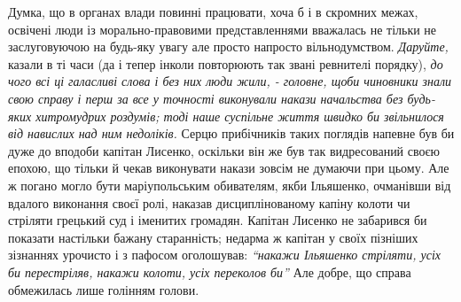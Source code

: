 \documentclass[a4paper,20pt]{report}
\begin{document}
Думка, що в органах влади повинні працювати, хоча б і в скромних межах,
освічені люди із морально-правовими представленнями вважалась не тільки не заслуговуючою
на будь-яку увагу але просто напросто вільнодумством. \emph{Даруйте,} казали в ті часи
(да і тепер інколи повторюють так звані ревнителі порядку), \emph{до чого всі ці галасливі слова і 
без них люди жили, - головне, щоби чиновники знали свою справу і перш за все у точності виконували
накази начальства без будь-яких хитромудрих роздумів; тоді наше суспільне життя швидко би звільнилося
від навислих над ним недоліків.}
Серцю прибічників таких поглядів напевне був би дуже до вподоби капітан
Лисенко, оскільки він же був так видресований своєю епохою, що тільки й чекав
виконувати накази зовсім не думаючи при цьому. Але ж погано могло бути маріупольським обивателям, якби
Ільяшенко, очманівши від вдалого виконання своєї ролі, наказав дисциплінованому
капіну колоти чи стріляти грецький суд і іменитих громадян. Капітан Лисенко не
забарився би показати настільки бажану старанність; недарма ж капітан у своїх
пізніших зізнаннях урочисто і з пафосом оголошував: \emph{``накажи Ільяшенко
стріляти, усіх би перестріляв, накажи колоти, усіх переколов би''} Але добре, що справа
обмежилась лише голінням голови.

\end{document}
